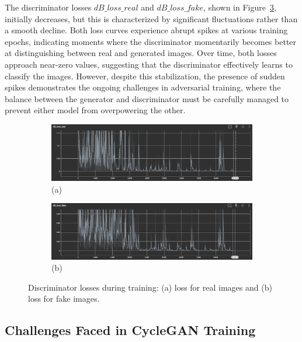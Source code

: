 \documentclass[12pt,DIV14,BCOR12mm,a4paper,footinclude=false,headinclude,parskip=half-,twoside,openright,cleardoublepage=empty,toc=index,bibliography=totoc,listof=totoc]{scrreprt}
\numberwithin{equation}{chapter}
\begin{document}
The discriminator losses \( dB\_loss\_real \) and \( dB\_loss\_fake \), shown in Figure~\ref{fig:discriminator_losses}, initially decreases, but this is characterized by significant fluctuations rather than a smooth decline. Both loss curves experience abrupt spikes at various training epochs, indicating moments where the discriminator momentarily becomes better at distinguishing between real and generated images. Over time, both losses approach near-zero values, suggesting that the discriminator effectively learns to classify the images. However, despite this stabilization, the presence of sudden spikes demonstrates the ongoing challenges in adversarial training, where the balance between the generator and discriminator must be carefully managed to prevent either model from overpowering the other.
\begin{figure}
    \centering
    \begin{subfigure}[b]{1.0\textwidth}
        \includegraphics[width=\linewidth]{../media/dB_loss_real.png}
        \caption*{(a)}
        \label{fig:dB_loss_real}
    \end{subfigure}

    \begin{subfigure}[b]{1.0\textwidth}
        \includegraphics[width=\linewidth]{../media/dB_loss_fake.png}
        \caption*{(b)}
        \label{fig:dB_loss_fake}
    \end{subfigure}

    \caption{Discriminator losses during training: (a) loss for real images and (b) loss for fake images.}
    \label{fig:discriminator_losses}
\end{figure}

\subsection{Challenges Faced in CycleGAN Training}
\end{document}

